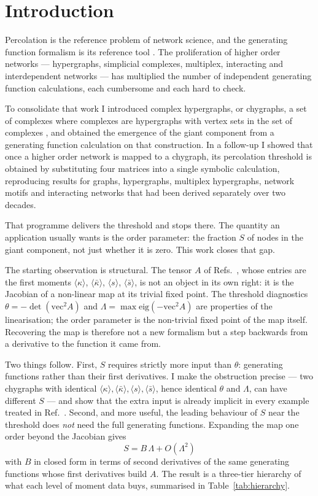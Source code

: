 \documentclass[aps,pre,twocolumn,superscriptaddress,floatfix,longbibliography]{revtex4-2}
\newcommand{\ave}[1]{\langle #1 \rangle}
\newcommand{\vecA}{\mathrm{vec}^2 A}
\begin{document}
\section{Introduction}

Percolation is the reference problem of network science, and the generating
function formalism is its reference tool \cite{molloy1998,callaway2000}. The
proliferation of higher order networks --- hypergraphs, simplicial complexes,
multiplex, interacting and interdependent networks
\cite{kivela2014,battiston2020,battiston2021,bianconi2021} --- has multiplied
the number of independent generating function calculations, each cumbersome and
each hard to check.

To consolidate that work I introduced complex hypergraphs, or chygraphs, a set
of complexes where complexes are hypergraphs with vertex sets in the set of
complexes \cite{vazquez2023pre}, and obtained the emergence of the giant
component from a generating function calculation on that construction. In a
follow-up \cite{vazquez2024comnet} I showed that once a higher order network is
mapped to a chygraph, its percolation threshold is obtained by substituting four
matrices into a single symbolic calculation, reproducing results for graphs,
hypergraphs, multiplex hypergraphs, network motifs and interacting networks that
had been derived separately over two decades.

That programme delivers the threshold and stops there. The quantity an
application usually wants is the order parameter: the fraction $S$ of nodes in
the giant component, not just whether it is zero. This work closes that gap.

The starting observation is structural. The tensor $A$ of
Refs.~\cite{vazquez2023pre,vazquez2024comnet}, whose entries are the first
moments $\ave{\kappa}$, $\ave{\bar\kappa}$, $\ave{s}$, $\ave{\bar s}$, is not an
object in its own right: it is the Jacobian of a non-linear map at its trivial
fixed point. The threshold diagnostics $\theta=-\det(\vecA)$ and
$\Lambda=\max\mathrm{eig}(-\vecA)$ are properties of the linearisation; the
order parameter is the non-trivial fixed point of the map itself. Recovering the
map is therefore not a new formalism but a step backwards from a derivative to
the function it came from.

Two things follow. First, $S$ requires strictly more input than $\theta$:
generating functions rather than their first derivatives. I make the obstruction
precise --- two chygraphs with identical $\ave{\kappa},\ave{\bar\kappa},
\ave{s},\ave{\bar s}$, hence identical $\theta$ and $\Lambda$, can have
different $S$ --- and show that the extra input is already implicit in every
example treated in Ref.~\cite{vazquez2024comnet}. Second, and more useful, the
leading behaviour of $S$ near the threshold does \emph{not} need the full
generating functions. Expanding the map one order beyond the Jacobian gives
\begin{equation}
  S = B\,\Lambda + O(\Lambda^2)
\end{equation}
with $B$ in closed form in terms of second derivatives of the same generating
functions whose first derivatives build $A$. The result is a three-tier
hierarchy of what each level of moment data buys, summarised in
Table~\ref{tab:hierarchy}.
\end{document}
